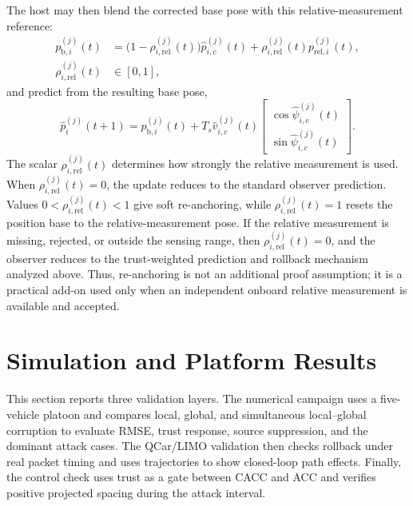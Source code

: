 \documentclass[letterpaper,journal]{IEEEtran}
\begin{document}
The host may then blend the corrected base pose with this relative-measurement reference:
\begin{equation}
\begin{aligned}
    p_{\mathrm b,i}^{(j)}(t)
    &=
    \big(1-\rho_{i,\mathrm{rel}}^{(j)}(t)\big)\hat p_{i,c}^{(j)}(t)
    +\rho_{i,\mathrm{rel}}^{(j)}(t)p_{\mathrm{rel},i}^{(j)}(t),
    \\
    \rho_{i,\mathrm{rel}}^{(j)}(t)&\in[0,1],
\end{aligned}
    \label{eq_pose_reanchor_base}
\end{equation}
and predict from the resulting base pose,
\begin{equation}
    \hat p_i^{(j)}(t+1)
    =
    p_{\mathrm b,i}^{(j)}(t)
    +T_s \hat v_{i,c}^{(j)}(t)
    \begin{bmatrix}
        \cos \hat\psi_{i,c}^{(j)}(t)\\
        \sin \hat\psi_{i,c}^{(j)}(t)
    \end{bmatrix}.
    \label{eq_pose_reanchor_prediction}
\end{equation}
The scalar $\rho_{i,\mathrm{rel}}^{(j)}(t)$ determines how strongly the relative measurement is used. When $\rho_{i,\mathrm{rel}}^{(j)}(t)=0$, the update reduces to the standard observer prediction. Values $0<\rho_{i,\mathrm{rel}}^{(j)}(t)<1$ give soft re-anchoring, while $\rho_{i,\mathrm{rel}}^{(j)}(t)=1$ resets the position base to the relative-measurement pose. If the relative measurement is missing, rejected, or outside the sensing range, then $\rho_{i,\mathrm{rel}}^{(j)}(t)=0$, and the observer reduces to the trust-weighted prediction and rollback mechanism analyzed above. Thus, re-anchoring is not an additional proof assumption; it is a practical add-on used only when an independent onboard relative measurement is available and accepted.



\section{Simulation and Platform Results}\label{sec_simulation}

This section reports three validation layers. The numerical campaign uses a five-vehicle platoon and compares local, global, and simultaneous local--global corruption to evaluate RMSE, trust response, source suppression, and the dominant attack cases. The QCar/LIMO validation then checks rollback under real packet timing and uses trajectories to show closed-loop path effects. Finally, the control check uses trust as a gate between CACC and ACC and verifies positive projected spacing during the attack interval.
\end{document}
